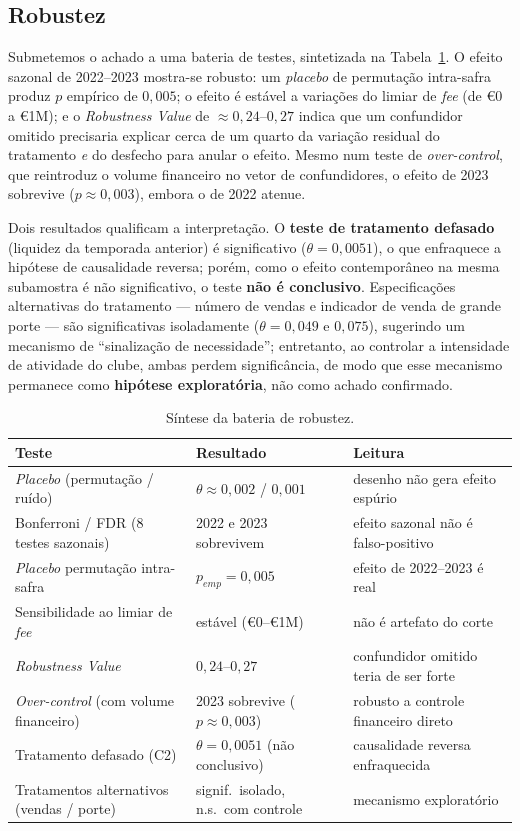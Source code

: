 \subsection{Robustez}

Submetemos o achado a uma bateria de testes, sintetizada na Tabela~\ref{tab:robustez}. O efeito
sazonal de 2022--2023 mostra-se robusto: um \textit{placebo} de permutação intra-safra produz
$p$ empírico de $0{,}005$; o efeito é estável a variações do limiar de \textit{fee} (de €0 a €1M); e
o \textit{Robustness Value} \cite{cinelli2020} de $\approx 0{,}24$--$0{,}27$ indica que um
confundidor omitido precisaria explicar cerca de um quarto da variação residual do tratamento
\textit{e} do desfecho para anular o efeito. Mesmo num teste de \textit{over-control}, que
reintroduz o volume financeiro no vetor de confundidores, o efeito de 2023 sobrevive
($p \approx 0{,}003$), embora o de 2022 atenue.

Dois resultados qualificam a interpretação. O \textbf{teste de tratamento defasado} (liquidez da
temporada anterior) é significativo ($\theta = 0{,}0051$), o que enfraquece a hipótese de
causalidade reversa; porém, como o efeito contemporâneo na mesma subamostra é não significativo, o
teste \textbf{não é conclusivo}. Especificações alternativas do tratamento — número de vendas e
indicador de venda de grande porte — são significativas isoladamente ($\theta = 0{,}049$ e
$0{,}075$), sugerindo um mecanismo de ``sinalização de necessidade''; entretanto, ao controlar a
intensidade de atividade do clube, ambas perdem significância, de modo que esse mecanismo permanece
como \textbf{hipótese exploratória}, não como achado confirmado.

\begin{table}[ht]
\centering
\caption{Síntese da bateria de robustez.}
\label{tab:robustez}
\begin{tabular}{lll}
\toprule
\textbf{Teste} & \textbf{Resultado} & \textbf{Leitura} \\
\midrule
\textit{Placebo} (permutação / ruído)      & $\theta \approx 0{,}002$ / $0{,}001$ & desenho não gera efeito espúrio \\
Bonferroni / FDR (8 testes sazonais)        & 2022 e 2023 sobrevivem & efeito sazonal não é falso-positivo \\
\textit{Placebo} permutação intra-safra     & $p_{emp} = 0{,}005$ & efeito de 2022--2023 é real \\
Sensibilidade ao limiar de \textit{fee}     & estável (€0--€1M) & não é artefato do corte \\
\textit{Robustness Value}                   & $0{,}24$--$0{,}27$ & confundidor omitido teria de ser forte \\
\textit{Over-control} (com volume financeiro)& 2023 sobrevive ($p\approx0{,}003$) & robusto a controle financeiro direto \\
Tratamento defasado (C2)                     & $\theta = 0{,}0051$ (não conclusivo) & causalidade reversa enfraquecida \\
Tratamentos alternativos (vendas / porte)    & signif.\ isolado, n.s.\ com controle & mecanismo exploratório \\
\bottomrule
\end{tabular}
\end{table}
